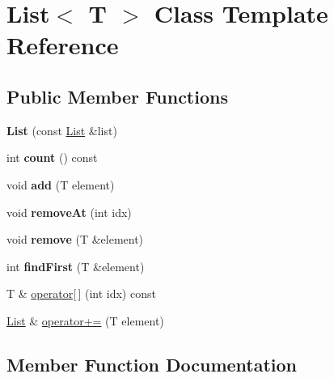 \hypertarget{class_list}{}\section{List$<$ T $>$ Class Template Reference}
\label{class_list}
\subsection*{Public Member Functions}
\begin{DoxyCompactItemize}
\item 
\mbox{\label{class_list_a296c8387f6c9c0292db7bb19f7e923ac}} 
{\bfseries List} (const \hyperlink{class_list}{List} \&list)
\item 
\mbox{\label{class_list_a7a74fc01260437fac92355dc8d4e789c}} 
int {\bfseries count} () const
\item 
\mbox{\label{class_list_acfdf6d32029662866a5aeb2c9c44bab8}} 
void {\bfseries add} (T element)
\item 
\mbox{\label{class_list_a54fa90e725d350cd7bd41270ebdfe775}} 
void {\bfseries remove\+At} (int idx)
\item 
\mbox{\label{class_list_ab20b18c4facb9c8ab89640c202057b80}} 
void {\bfseries remove} (T \&element)
\item 
\mbox{\label{class_list_aab90a0362da4ba513ac5460af21e1adb}} 
int {\bfseries find\+First} (T \&element)
\item 
T \& \hyperlink{class_list_af9d0336374aa0025662e16f2b087819c}{operator\mbox{[}$\,$\mbox{]}} (int idx) const
\item 
\hyperlink{class_list}{List} \& \hyperlink{class_list_a81a44c4aae9bb74b5166004cd28d9ac6}{operator+=} (T element)
\end{DoxyCompactItemize}


\subsection{Member Function Documentation}
\mbox{\label{class_list_a81a44c4aae9bb74b5166004cd28d9ac6}} 
